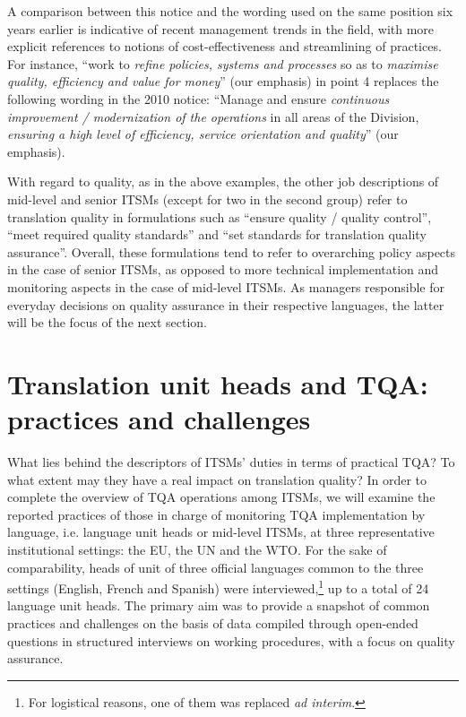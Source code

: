 \documentclass[output=paper]{langsci/langscibook}
\begin{document}
A comparison between this notice and the wording used on the same position six years earlier is indicative of recent management trends in the field, with more explicit references to notions of cost-effectiveness and streamlining of practices. For instance, “work to \textit{refine policies, systems and processes} so as to \textit{maximise quality, efficiency and value for money}” (our emphasis) in point 4 replaces the following wording in the 2010 notice: “Manage and ensure \textit{continuous improvement / modernization of the operations} in all areas of the Division, \textit{ensuring a high level of efficiency, service orientation and quality}” (our emphasis).



With regard to quality, as in the above examples, the other job descriptions of mid-level and senior ITSMs (except for two in the second group) refer to translation quality in formulations such as “ensure quality / quality control”, “meet required quality standards” and “set standards for translation quality assurance”. Overall, these formulations tend to refer to overarching policy aspects in the case of senior ITSMs, as opposed to more technical implementation and monitoring aspects in the case of mid-level ITSMs. As managers responsible for everyday decisions on quality assurance in their respective languages, the latter will be the focus of the next section. 



\section{Translation unit heads and TQA: practices and challenges}\label{sec:prietoramos:3}



What lies behind the descriptors of ITSMs’ duties in terms of practical TQA? To what extent may they have a real impact on translation quality? In order to complete the overview of TQA operations among ITSMs, we will examine the reported practices of those in charge of monitoring TQA implementation by language, i.e. language unit heads or mid-level ITSMs, at three representative institutional settings: the EU, the UN and the WTO. For the sake of comparability, heads of unit of three official languages common to the three settings (English, French and Spanish) were interviewed,\footnote{For logistical reasons, one of them was replaced \textit{ad interim}.} up to a total of 24 language unit heads. The primary aim was to provide a snapshot of common practices and challenges on the basis of data compiled through open-ended questions in structured interviews on working procedures, with a focus on quality assurance.
\end{document}
